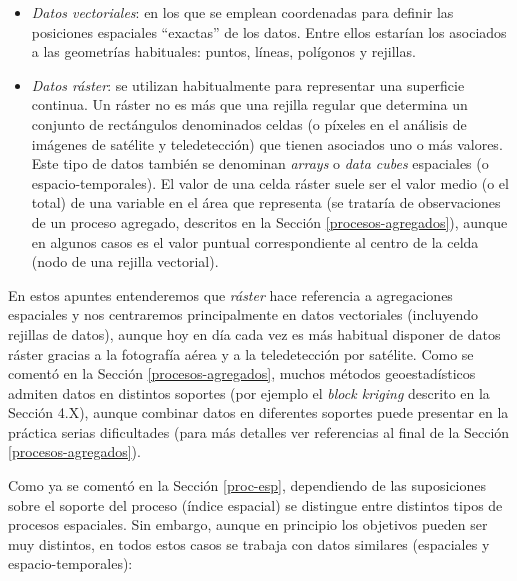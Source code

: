 \documentclass[
  spanish,
]{book}
\theoremstyle{break}
\begin{document}
\begin{itemize}
\item
  \emph{Datos vectoriales}: en los que se emplean coordenadas para definir las posiciones espaciales ``exactas'' de los datos. Entre ellos estarían los asociados a las geometrías habituales: puntos, líneas, polígonos y rejillas.
\item
  \emph{Datos ráster}: se utilizan habitualmente para representar una superficie continua. Un ráster no es más que una rejilla regular que determina un conjunto de rectángulos denominados celdas (o píxeles en el análisis de imágenes de satélite y teledetección) que tienen asociados uno o más valores. Este tipo de datos también se denominan \emph{arrays} o \emph{data cubes} espaciales (o espacio-temporales). El valor de una celda ráster suele ser el valor medio (o el total) de una variable en el área que representa (se trataría de observaciones de un proceso agregado, descritos en la Sección \ref{procesos-agregados}), aunque en algunos casos es el valor puntual correspondiente al centro de la celda (nodo de una rejilla vectorial).
\end{itemize}

En estos apuntes entenderemos que \emph{ráster} hace referencia a agregaciones espaciales y nos centraremos principalmente en datos vectoriales (incluyendo rejillas de datos), aunque hoy en día cada vez es más habitual disponer de datos ráster gracias a la fotografía aérea y a la teledetección por satélite.
Como se comentó en la Sección \ref{procesos-agregados}, muchos métodos geoestadísticos admiten datos en distintos soportes (por ejemplo el \emph{block kriging} descrito en la Sección 4.X), aunque combinar datos en diferentes soportes puede presentar en la práctica serias dificultades (para más detalles ver referencias al final de la Sección \ref{procesos-agregados}).

Como ya se comentó en la Sección \ref{proc-esp}, dependiendo de las suposiciones sobre el soporte del proceso (índice espacial) se distingue entre distintos tipos de procesos espaciales.
Sin embargo, aunque en principio los objetivos pueden ser muy distintos, en todos estos casos se trabaja con datos similares (espaciales y espacio-temporales):
\end{document}
